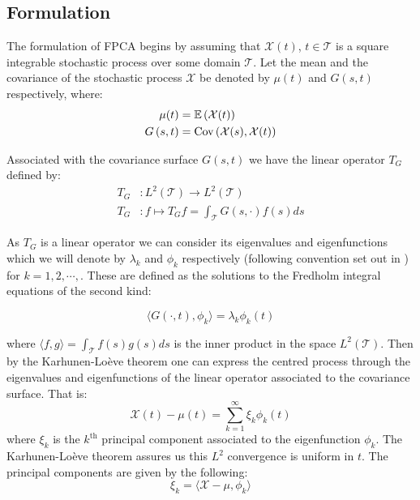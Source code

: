 \subsection{Formulation}
The formulation of FPCA begins by assuming that $\mathcal{X}(t)$, $t \in \mathcal{T}$ is a square integrable stochastic process over some domain $\mathcal{T}$.
Let the mean and the covariance of the stochastic process $\mathcal{X}$ be denoted by $\mu(t)$ and $G\left(s, t\right)$ respectively, where:
\begin{align}
	\mu(t) &= \operatorname{\mathbb{E}} \left(\mathcal{X}(t)\right) \label{eqn:mean_fn}\\
	G\left(s, t\right) &= \text{Cov}\left(\mathcal{X}(s),  \mathcal{X}(t)\right) \label{eqn:cov_fn}
\end{align}

Associated with the covariance surface $G\left(s, t\right)$ we have the linear operator $T_G$ defined by:
\begin{align}
	T_G &: L^2\left(\mathcal{T}\right) \to L^2\left(\mathcal{T}\right) \\
	T_G&:  f \mapsto T_G f = \int_{\mathcal{T}} G\left(s, \cdot \right) f(s) ds \label{eqn:t_op}
\end{align}

As $T_G$ is a linear operator we can consider its eigenvalues and eigenfunctions which we will denote by $\lambda_k$ and $\phi_k$ respectively (following convention set out in \citep{yao_functional_2005}) for $k=1,2,\cdots,$.
These are defined as the solutions to the Fredholm integral equations of the second kind: 

\begin{equation}\label{eqn:fredholm}
	\langle G(\cdot, t), \phi_k \rangle = \lambda_k \phi_k(t)
\end{equation}

where $\langle f, g \rangle = \int_{\mathcal{T}} f(s) g(s) ds$ is the inner product in the space $L^2(\mathcal{T})$. 
Then by the Karhunen-Lo\`{e}ve theorem one can express the centred process through the eigenvalues and eigenfunctions of the linear operator associated to the covariance surface.
That is:
\begin{equation}\label{eqn:fpca}
	\mathcal{X}(t) - \mu(t) = \sum_{k=1}^{\infty}\xi_k \phi_k(t)
\end{equation}
where $\xi_k$ is the $k^\text{th}$ principal component associated to the eigenfunction $\phi_k$.
The Karhunen-Lo\`{e}ve theorem assures us this $L^2$ convergence is uniform in $t$.
The principal components are given by the following: 
\begin{equation}\label{eqn:principal_comp}
	\xi_k= \langle \mathcal{X} - \mu, \phi_k \rangle 
\end{equation}

